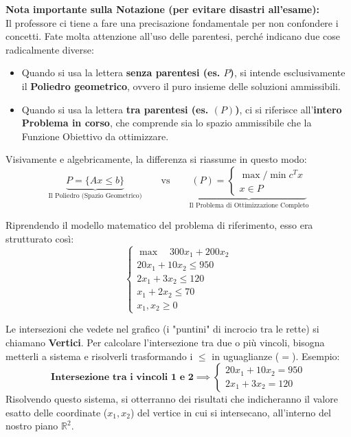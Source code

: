 \documentclass[12pt, a4paper]{article}
\begin{document}
	\vspace{0.4cm}
	\textbf{Nota importante sulla Notazione (per evitare disastri all'esame):}\\
	Il professore ci tiene a fare una precisazione fondamentale per non confondere i concetti. Fate molta attenzione all'uso delle parentesi, perché indicano due cose radicalmente diverse:
	\begin{itemize}[label=$\circ$, itemsep=2pt, leftmargin=1.5cm]
		\item Quando si usa la lettera \textbf{senza parentesi (es. $P$)}, si intende esclusivamente il \textbf{Poliedro geometrico}, ovvero il puro insieme delle soluzioni ammissibili.
		\item Quando si usa la lettera \textbf{tra parentesi (es. $(P)$)}, ci si riferisce all'\textbf{intero Problema in corso}, che comprende sia lo spazio ammissibile che la Funzione Obiettivo da ottimizzare.
	\end{itemize}
	
	Visivamente e algebricamente, la differenza si riassume in questo modo:
	\[
	\underbrace{P = \{ Ax \leq b \}}_{\text{Il Poliedro (Spazio Geometrico)}} 
	\qquad \text{vs} \qquad 
	\underbrace{(P) = \begin{cases} \max/\min c^T x \\ x \in P \end{cases}}_{\text{Il Problema di Ottimizzazione Completo}}
	\]
	
	Riprendendo il modello matematico del problema di riferimento, esso era strutturato così:
	\[ 
	\begin{cases}
		\max \quad 300x_1 + 200x_2 \\
		20x_1 + 10x_2 \leq 950 \\
		2x_1 + 3x_2 \leq 120 \\
		x_1 + 2x_2 \leq 70 \\
		x_{1}, x_{2} \geq 0
	\end{cases}
	\]
	
	Le intersezioni che vedete nel grafico (i "puntini" di incrocio tra le rette) si chiamano \textbf{Vertici}. Per calcolare l'intersezione tra due o più vincoli, bisogna metterli a sistema e risolverli trasformando i $\leq$ in uguaglianze ($=$). 
	Esempio:
	\[
	\textbf{Intersezione tra i vincoli 1 e 2} \implies
	\begin{cases}
		20x_1 + 10x_2 = 950 \\
		2x_1 + 3x_2 = 120
	\end{cases}
	\]
	Risolvendo questo sistema, si otterranno dei risultati che indicheranno il valore esatto delle coordinate ($x_1, x_2$) del vertice in cui si intersecano, all'interno del nostro piano $\mathbb{R}^2$.
	
\end{document}
